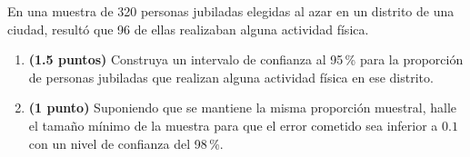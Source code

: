 
En una muestra de 320 personas jubiladas elegidas al azar en un distrito de
una ciudad, resultó que 96 de ellas realizaban alguna actividad física.
\begin{enumerate}[label=\alph*)]
  \item \textbf{(1.5 puntos)} Construya un intervalo de confianza al
  95\,\% para la proporción de personas jubiladas que realizan alguna
  actividad física en ese distrito.
  \item \textbf{(1 punto)} Suponiendo que se mantiene la misma proporción
  muestral, halle el tamaño mínimo de la muestra para que el error cometido
  sea inferior a $0.1$ con un nivel de confianza del 98\,\%.
\end{enumerate}
